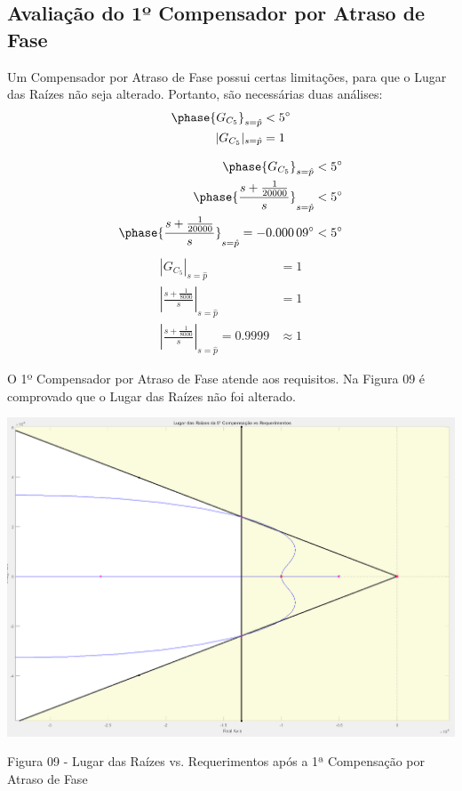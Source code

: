 \documentclass[a4paper]{article}
\begin{document}
 \subsection{Avaliação do 1º Compensador por Atraso de Fase}
 \par Um Compensador por Atraso de Fase possui certas limitações, para que o Lugar das Raízes não seja alterado. Portanto, são necessárias duas análises:
\begin{align}
	\phase{G_{C_5}}_{s=\hat{p}} &< \ang{5} 
	\\
	|G_{C_5}|_{s=\hat{p}} &= 1
\end{align}

\vspace{0.5em}

\begin{align}
\phase{G_{C_5}}_{s=\hat{p}} &< \ang{5} \\
\phase{\frac{s+\frac{1}{20000}}{s}}_{s=\hat{p}} &< \ang{5}  \\
\phase{\frac{s+\frac{1}{20000}}{s}}_{s=\hat{p}} =\ang{-0.00009} &< \ang{5} 
\end{align}
\vspace{0.5em}
\begin{align}
|G_{C_5}|_{s=\hat{p}} &= 1 \\
|\frac{s+\frac{1}{8000}}{s}|_{s=\hat{p}} &= 1  \\
|\frac{s+\frac{1}{8000}}{s}|_{s=\hat{p}} = 0.9999 &\approx 1  
\end{align}
\vspace{0.5em}
\par O 1º Compensador por Atraso de Fase atende aos requisitos. Na Figura 09 é comprovado que o Lugar das Raízes não foi alterado.
\begin{center}
	\includegraphics[width=40em,keepaspectratio]{lugar_das_raizes_15_compensacao_requerimentos}
	\par Figura 09 - Lugar das Raízes vs. Requerimentos após a 1ª Compensação por Atraso de Fase
\end{center}
\vspace{0.5em}
\end{document}
